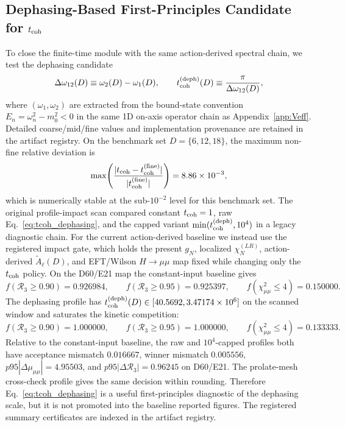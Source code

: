 \documentclass[aps,prd,onecolumn,notitlepage,nofootinbib,superscriptaddress,11pt,floatfix]{revtex4-2}
\begin{document}
\subsection{Dephasing-Based First-Principles Candidate for \texorpdfstring{$t_{\rm coh}$}{tcoh}}
\label{app:tcoh_candidate}
To close the finite-time module with the same action-derived spectral chain, we test the dephasing candidate
\begin{equation}
\Delta\omega_{12}(D)\equiv \omega_2(D)-\omega_1(D),\qquad
t_{\rm coh}^{\rm(deph)}(D)\equiv \frac{\pi}{\Delta\omega_{12}(D)},
\label{eq:tcoh_dephasing}
\end{equation}
where $(\omega_1,\omega_2)$ are extracted from the bound-state convention $E_n=\omega_n^2-m_0^2<0$ in the same 1D on-axis operator chain as Appendix~\ref{app:Veff}. Detailed coarse/mid/fine values and implementation provenance are retained in the artifact registry. On the benchmark set $D=\{6,12,18\}$, the maximum non-fine relative deviation is
\begin{equation}
\max\!\left(\frac{|t_{\rm coh}-t_{\rm coh}^{\rm(fine)}|}{|t_{\rm coh}^{\rm(fine)}|}\right)=8.86\times10^{-3},
\end{equation}
which is numerically stable at the sub-$10^{-2}$ level for this benchmark set.
The original profile-impact scan compared constant $t_{\rm coh}=1$, raw Eq.~\eqref{eq:tcoh_dephasing}, and the capped variant $\min(t_{\rm coh}^{\rm(deph)},10^4)$ in a legacy diagnostic chain.  For the current action-derived baseline we instead use the registered impact gate, which holds the present $g_N$, localized $\chi_N^{(LR)}$, action-derived $\tilde A_\ell(D)$, and EFT/Wilson $H\to\mu\mu$ map fixed while changing only the $t_{\rm coh}$ policy.  On the D60/E21 map the constant-input baseline gives
\begin{equation}
f(\mathcal R_3\ge0.90)=0.926984,\qquad
f(\mathcal R_3\ge0.95)=0.925397,\qquad
f(\chi^2_{\mu\mu}\le4)=0.150000.
\end{equation}
The dephasing profile has \(t_{\rm coh}^{\rm(deph)}(D)\in[40.5692,3.47174\times10^6]\) on the scanned window and saturates the kinetic competition:
\begin{equation}
f(\mathcal R_3\ge0.90)=1.000000,\qquad
f(\mathcal R_3\ge0.95)=1.000000,\qquad
f(\chi^2_{\mu\mu}\le4)=0.133333.
\end{equation}
Relative to the constant-input baseline, the raw and \(10^4\)-capped profiles both have acceptance mismatch \(0.016667\), winner mismatch \(0.005556\), \(p95|\Delta\mu_{\mu\mu}|=4.95503\), and \(p95|\Delta\mathcal R_3|=0.96245\) on D60/E21.  The prolate-mesh cross-check profile gives the same decision within rounding.  Therefore Eq.~\eqref{eq:tcoh_dephasing} is a useful first-principles diagnostic of the dephasing scale, but it is not promoted into the baseline reported figures.  The registered summary certificates are indexed in the artifact registry.
\end{document}
